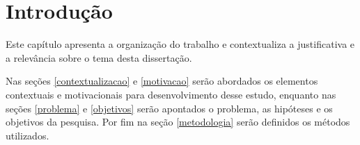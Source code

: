 \chapter{Introdução}
\label{chap:intro}

Este capítulo apresenta a organização do trabalho e contextualiza a justificativa e a relevância sobre o tema desta dissertação. 

 

Nas seções \ref{contextualizacao} e \ref{motivacao} serão abordados os elementos contextuais e motivacionais para desenvolvimento desse estudo, enquanto nas seções \ref{problema} e \ref{objetivos} serão apontados o problema, as hipóteses e os objetivos da pesquisa. Por fim na seção \ref{metodologia} serão definidos os métodos utilizados.


 

 
  
  
 
 
      
 
 
% 
 
% 

%

%

%  

